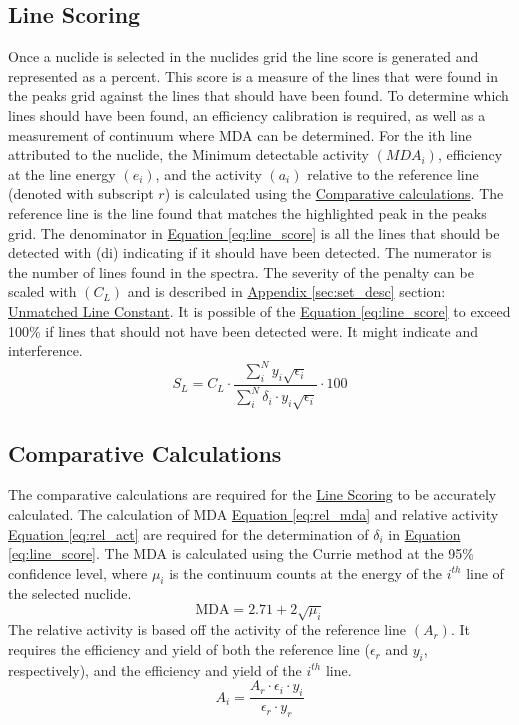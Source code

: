 \documentclass[12pt,report,justified]{SANDreport}
\begin{document}
\subsection{Line Scoring}\label{sec:ln_score}
Once a nuclide is selected in the nuclides grid the line score is generated and represented as a
percent. This score is a measure of the lines that were found in the peaks grid against the lines
that should have been found. To determine which lines should have been found, an efficiency
calibration is required, as well as a measurement of continuum where MDA can be determined.
For the ith line attributed to the nuclide, the Minimum detectable activity \( \left(MDA_i\right) \), 
efficiency at
the line energy \(\left(e_i\right)\), and the activity \(\left( a_i\right)\) relative to the reference line (denoted with subscript \(r\)) is
calculated using the \hyperref[sec:comp_calcs]{Comparative calculations}. The reference line is the line found that matches
the highlighted peak in the peaks grid. The denominator in \hyperref[eq:line_score]{Equation \ref{eq:line_score}} is all the lines that should
be detected with (di) indicating if it should have been detected. The numerator is the number of
lines found in the spectra. The severity of the penalty can be scaled with \(\left(C_L\right)\) and is described in
\hyperref[sec:set_desc]{Appendix \ref{sec:set_desc}} section: \hyperref[itm:sm_peak_pen]{Unmatched Line Constant}. It is possible of the \hyperref[eq:line_score]{Equation \ref{eq:line_score}} to exceed 100\% if
lines that should not have been detected were. It might indicate and interference.
\begin{equation}
S_L = C_L \cdot \frac{\sum_i^N y_i \sqrt{\epsilon _i}}{\sum_i^N \delta _i \cdot y_i \sqrt{\epsilon _i}} \cdot 100
\label{eq:line_score}
\end{equation}

\subsection{Comparative Calculations} \label{sec:comp_calcs}
The comparative calculations are required for the \hyperref[sec:ln_score]{Line Scoring} to be accurately calculated. The
calculation of MDA \hyperref[eq:rel_mda]{Equation \ref{eq:rel_mda}} and relative activity \hyperref[eq:rel_act]{Equation \ref{eq:rel_act}} are required for the determination of \(\delta _i\) in \hyperref[eq:line_score]{Equation \ref{eq:line_score}}. The MDA is calculated using the Currie method at the 95\% confidence level, where \(\mu _i\) is the continuum counts at the energy of the \(i^{th}\) line of the selected nuclide.
\begin{equation}
\text{MDA} = 2.71 + 2 \sqrt{\mu _i}
\label{eq:rel_mda}
\end{equation}
The relative activity is based off the activity of the reference line \(\left(A_r\right)\). It requires the efficiency
and yield of both the reference line (\(\epsilon _r \) and  \(y_i\), respectively), and the efficiency and yield of the \(i^{th}\)
line.
\begin{equation}
A_i = \frac{A_r \cdot \epsilon _i \cdot y_i}{\epsilon _r \cdot y_r}
\label{eq:rel_act}
\end{equation}
\end{document}
